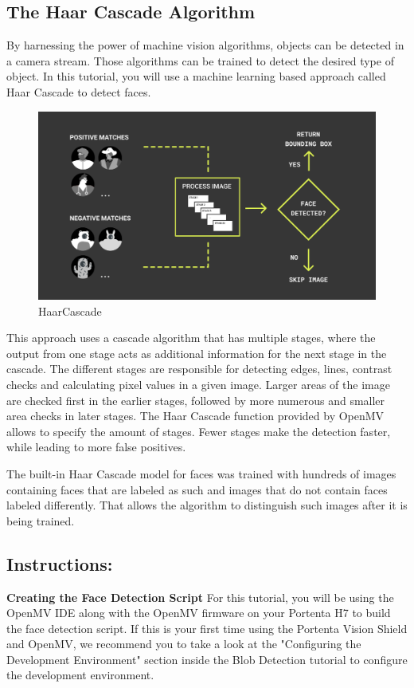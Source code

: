 \subsection{The Haar Cascade Algorithm}
By harnessing the power of machine vision algorithms, objects can be detected in a camera stream. Those algorithms can be trained to detect the desired type of object. In this tutorial, you will use a machine learning based approach called Haar Cascade to detect faces.

\begin{figure}
	\begin{center}
		\includegraphics[width=0.7\linewidth]{Images/VisionShield/HaarCascade.png}
		\caption{HaarCascade}
		\label{HaarCascade}
	\end{center}
\end{figure}

This approach uses a cascade algorithm that has multiple stages, where the output from one stage acts as additional information for the next stage in the cascade. The different stages are responsible for detecting edges, lines, contrast checks and calculating pixel values in a given image. Larger areas of the image are checked first in the earlier stages, followed by more numerous and smaller area checks in later stages. The Haar Cascade function provided by OpenMV allows to specify the amount of stages. Fewer stages make the detection faster, while leading to more false positives.

The built-in Haar Cascade model for faces was trained with hundreds of images containing faces that are labeled as such and images that do not contain faces labeled differently. That allows the algorithm to distinguish such images after it is being trained.

\subsection{Instructions:}

\textbf{Creating the Face Detection Script}
For this tutorial, you will be using the OpenMV IDE along with the OpenMV firmware on your Portenta H7 to build the face detection script. If this is your first time using the Portenta Vision Shield and OpenMV, we recommend you to take a look at the "Configuring the Development Environment" section inside the Blob Detection tutorial to configure the development environment.


